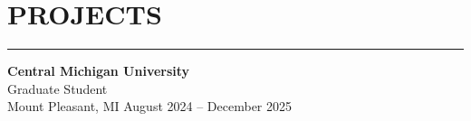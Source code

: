 \documentclass[11pt]{article}
\begin{document}

% 


\section*{PROJECTS}
\vspace{-1.2em}
\noindent\rule{\linewidth}{0.4pt}
\textbf{Central Michigan University} \\
Graduate Student \\
Mount Pleasant, MI \hfill August 2024 -- December 2025
\end{document}
